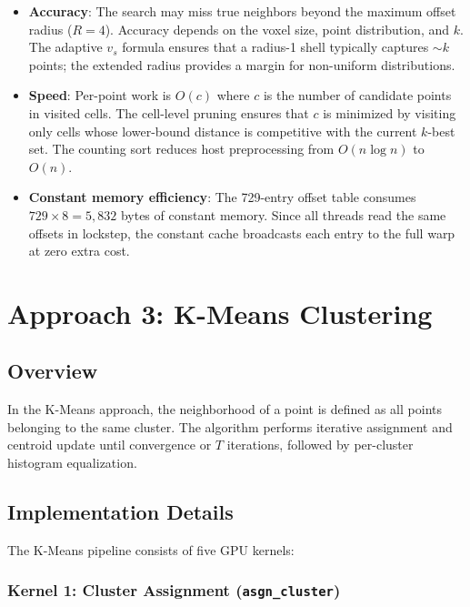 \documentclass[11pt,a4paper]{article}
\begin{document}
\begin{itemize}
    \item \textbf{Accuracy}: The search may miss true neighbors beyond the maximum offset radius ($R = 4$). Accuracy depends on the voxel size, point distribution, and $k$. The adaptive $v_s$ formula ensures that a radius-1 shell typically captures $\sim k$ points; the extended radius provides a margin for non-uniform distributions.
    \item \textbf{Speed}: Per-point work is $O(c)$ where $c$ is the number of candidate points in visited cells. The cell-level pruning ensures that $c$ is minimized by visiting only cells whose lower-bound distance is competitive with the current $k$-best set. The counting sort reduces host preprocessing from $O(n \log n)$ to $O(n)$.
    \item \textbf{Constant memory efficiency}: The 729-entry offset table consumes $729 \times 8 = 5{,}832$ bytes of constant memory. Since all threads read the same offsets in lockstep, the constant cache broadcasts each entry to the full warp at zero extra cost.
\end{itemize}

\section{Approach 3: K-Means Clustering}

\subsection{Overview}

In the K-Means approach, the neighborhood of a point is defined as all points belonging to the same cluster. The algorithm performs iterative assignment and centroid update until convergence or $T$ iterations, followed by per-cluster histogram equalization.

\subsection{Implementation Details}

The K-Means pipeline consists of five GPU kernels:

\subsubsection{Kernel 1: Cluster Assignment (\texttt{asgn\_cluster})}
\end{document}
